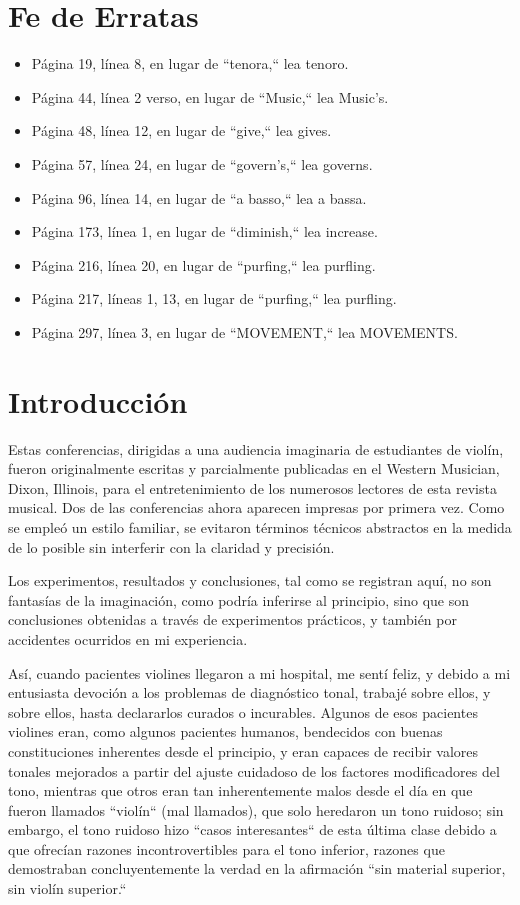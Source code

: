 \documentclass[12pt]{book}
\begin{document}
\chapter*{Fe de Erratas}

\begin{itemize}
    \item Página 19, línea 8, en lugar de ``tenora,`` lea tenoro.
    \item Página 44, línea 2 verso, en lugar de ``Music,`` lea Music's.
    \item Página 48, línea 12, en lugar de ``give,`` lea gives.
    \item Página 57, línea 24, en lugar de ``govern's,`` lea governs.
    \item Página 96, línea 14, en lugar de ``a basso,`` lea a bassa.
    \item Página 173, línea 1, en lugar de ``diminish,`` lea increase.
    \item Página 216, línea 20, en lugar de ``purfing,`` lea purfling.
    \item Página 217, líneas 1, 13, en lugar de ``purfing,`` lea purfling.
    \item Página 297, línea 3, en lugar de ``MOVEMENT,`` lea MOVEMENTS.
\end{itemize}

\chapter*{Introducción}

Estas conferencias, dirigidas a una audiencia imaginaria de estudiantes de violín, fueron originalmente escritas y parcialmente publicadas en el Western Musician, Dixon, Illinois, para el entretenimiento de los numerosos lectores de esta revista musical. Dos de las conferencias ahora aparecen impresas por primera vez. Como se empleó un estilo familiar, se evitaron términos técnicos abstractos en la medida de lo posible sin interferir con la claridad y precisión.

Los experimentos, resultados y conclusiones, tal como se registran aquí, no son fantasías de la imaginación, como podría inferirse al principio, sino que son conclusiones obtenidas a través de experimentos prácticos, y también por accidentes ocurridos en mi experiencia.

Así, cuando pacientes violines llegaron a mi hospital, me sentí feliz, y debido a mi entusiasta devoción a los problemas de diagnóstico tonal, trabajé sobre ellos, y sobre ellos, hasta declararlos curados o incurables. Algunos de esos pacientes violines eran, como algunos pacientes humanos, bendecidos con buenas constituciones inherentes desde el principio, y eran capaces de recibir valores tonales mejorados a partir del ajuste cuidadoso de los factores modificadores del tono, mientras que otros eran tan inherentemente malos desde el día en que fueron llamados ``violín`` (mal llamados), que solo heredaron un tono ruidoso; sin embargo, el tono ruidoso hizo ``casos interesantes`` de esta última clase debido a que ofrecían razones incontrovertibles para el tono inferior, razones que demostraban concluyentemente la verdad en la afirmación ``sin material superior, sin violín superior.``
\end{document}
